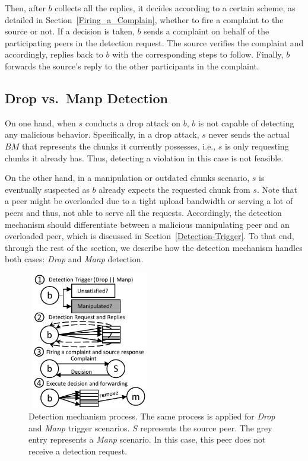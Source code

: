 Then, after $b$ collects all the replies, it decides according to a certain scheme, as detailed in Section~\ref{Firing_a_Complain}, whether to fire a complaint to the source or not.
If a decision is taken, $b$ sends a complaint on behalf of the participating peers in the detection request. 
The source verifies the complaint and accordingly, replies back to $b$ with the corresponding steps to follow. 
Finally, $b$ forwards the source's reply to the other participants in the complaint.

\subsection{Drop vs.\ Manp Detection}

On one hand, when $s$ conducts a drop attack on $b$, $b$ is not capable of detecting any malicious behavior.
Specifically, in a drop attack, $s$ never sends the actual $BM$ that represents the chunks it currently possesses, i.e., $s$ is only requesting chunks it already has.
Thus, detecting a violation in this case is not feasible.

On the other hand, in a manipulation or outdated chunks scenario, $s$ is eventually suspected as $b$ already expects the requested chunk from $s$.
Note that a peer might be overloaded due to a tight upload bandwidth or serving a lot of peers and thus, not able to serve all the requests.
Accordingly, the detection mechanism should differentiate between a malicious manipulating peer and an overloaded peer, which is discussed in Section~\ref{Detection-Trigger}.
To that end, through the rest of the section, we describe how the detection mechanism handles both cases: \textit{Drop} and \textit{Manp} detection.

\begin{figure}
 \centering
 \includegraphics[width=5.5cm,height=6cm]{./Figures/detection.pdf}
  \caption{Detection mechanism process. The same process is applied for \textit{Drop} and \textit{Manp} trigger scenarios. $S$ represents the source peer. The grey entry represents a \textit{Manp} scenario. In this case, this peer does not receive a detection request.}
\label{detection-blocks} 
\end{figure}

